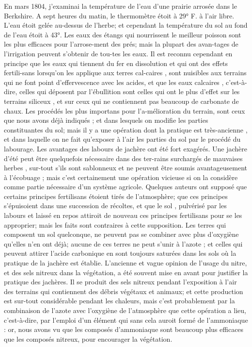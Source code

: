 En mars 1804, j'examinai la température de l'eau d'une prairie arrosée dans le Berkshire. A sept heures du matin, le thermomètre étoit à 29° F. à l'air libre. L'eau étoit gelée au-dessus de l'herbe; et cependant la température du sol au fond de l'eau étoit à 43°.\setcounter{page}{279} Les eaux des étangs qui nourrissent le meilleur poisson sont les plus efficaces pour l’arrose-ment des prés; mais la plupart des avan-tages de l’irrigation peuvent s’obtenir de tou-tes les eaux. Il est reconnu cependant en principe que les eaux qui tiennent du fer en dissolution et qui ont des effets fertili-sans lorsqu’on les applique aux terres cal-caires , sont nuisibles aux terrains qui ne font point d’effervescence avec les acides, et que les eaux calcaires , c’est-à-dire, celles qui déposent par l’ébullition sont celles qui ont le plus d’effet sur les terrains siliceux , et sur ceux qui ne contiennent pas beaucoup de carbonate de chaux.
Les procédés les plus importans pour l’a-mélioration du terrain, sont ceux que nous avons déjà indiqués ; et dans lesquels on modifie les parties constituantes du sol; mais il y a une opération dont la pratique est très-ancienne , et dans laquelle on ne fait qu’exposer à l’air les parties du sol par le procédé du labourage.
Les avantages des labours de jachère ont été fort exagérés. Une jachère d’été peut être quelquefois nécessaire dans des ter-rains surchargés de mauvaises herbes , sur-tout s’ils sont sablonneux et ne peuvent être soumis avantageusement à l’écobuage ; mais\setcounter{page}{280} c'est certainement une opération vicieuse si on la considère comme partie nécessaire d'un système agricole.
Quelques auteurs ont supposé que certains principes fertilisans étoient tirés de l'atmosphère; que ces principes s'épuisoient dans une succession de récoltes, et que le sol , pulvérisé par les labours et laissé en repos attiroit de nouveau ces principes fertilisans pour se les approprier; mais les faits sont contraires à cette supposition. Les terres qui composent un sol quelconque, ne peuvent pas se combiner avec plus d'oxygiène qu'elles n'en ont déjà; aucune de ces terres ne peut s'unir à l'azote ; et celles qui peuvent attirer l'acide carbonique en sont toujours saturées dans les sols où la pratique de la jachère est établie. L'ancienne et vague opinion de l'usage du nitre, et des sels nitreux dans la végétation, a été souvent mise en avant pour justifier la pratique des jachères. Il se produit des sels nitreux pendant l'exposition à l'air des terrains qui contiennent des débris végétaux et animaux; et cette production est sur-tout considérable pendant les chaleurs, mais c'est probablement par la combinaison de l'azote avec l'oxygiène de l'atmosphère que cette opération a lieu, c'est-à-dire, par l'emploi d'un élément qui sans cela auroit formé\setcounter{page}{281} de l'ammoniaque : or, nous avons vu que les composés d'ammoniaque sont beaucoup plus efficaces que les composés nitreux, pour encourager la végétation.
